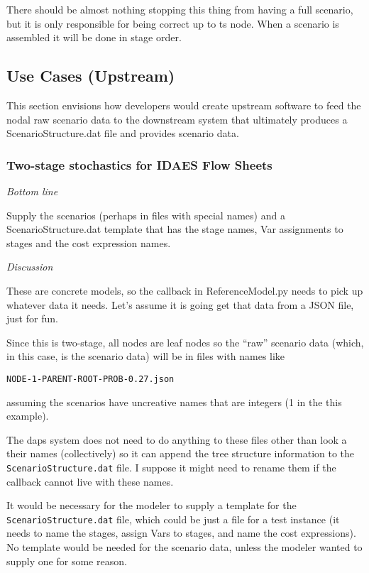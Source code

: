 \documentclass[12pt]{article}
\begin{document}
There should be almost nothing stopping this thing from having a full
scenario, but it is only responsible for being correct up to
ts node. When a scenario is assembled it will be done in stage order.

\subsection{Use Cases (Upstream)}

This section envisions how developers would create upstream
software to feed the nodal raw scenario data to the downstream
system that ultimately produces a ScenarioStructure.dat file
and provides scenario data.

\subsubsection{Two-stage stochastics for IDAES Flow Sheets}

{\em Bottom line}

Supply the scenarios (perhaps in files with special names) and a
ScenarioStructure.dat template that has the stage names, Var
assignments to stages and the cost expression names.

{\em Discussion}

These are concrete models, so the callback in ReferenceModel.py needs
to pick up whatever data it needs. Let's assume it is going get
that data from a JSON file, just for fun.

Since this is two-stage, all nodes are leaf nodes so the ``raw'' scenario
data (which, in this case, is the scenario data) will be in files with
names like
\begin{verbatim}
NODE-1-PARENT-ROOT-PROB-0.27.json
\end{verbatim}
assuming the scenarios have uncreative names that are integers (1 in the this example).

The daps system does not need to do anything to these files other
than look a their names (collectively) so it can append the
tree structure information to the \verb|ScenarioStructure.dat| file.
I suppose it might need to rename them if the callback cannot live
with these names.

It would be necessary for the modeler to supply a template for the
\verb|ScenarioStructure.dat| file, which could be just a file
for a test instance (it needs to name the stages, assign Vars to stages, and name
the cost expressions). No template
would be needed for the scenario data, unless the modeler wanted to
supply one for some reason.
\end{document}
